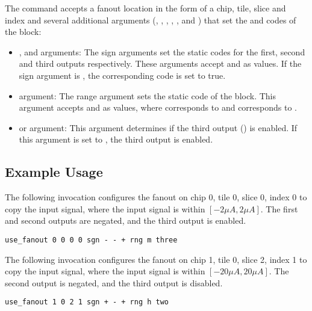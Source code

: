 The  command accepts a fanout location in the form of a chip,
tile, slice and index and several additional arguments
(, , , , , and ) that set
the \static and \dynamic codes of the block:
\begin{itemize}
\item {}, and  arguments: The sign arguments set the
   static codes for the first, second and third outputs respectively.
  These arguments accept \tx{+} and \tx{-} as values. If the sign argument is
  \tx{-}, the corresponding  code is set to true.
  \item{} argument: The range argument sets the  static code
    of the block. This argument accepts  and  as values, where
     corresponds to  and  corresponds to
    .
    \item{} or  argument: This argument determines if the third
      output () is enabled. If this argument is set to , the
      third output is enabled.
  \end{itemize}

\subsection{Example Usage}

The following invocation configures the fanout on chip 0, tile 0, slice 0, index
0 to copy the input signal, where the input signal is within $[-2 \mu A, 2 \mu
A]$. The first and second outputs are negated, and the third output is enabled.

\begin{lstlisting}
use_fanout 0 0 0 0 sgn - - + rng m three
\end{lstlisting}

The following invocation configures the fanout on chip 1, tile 0, slice 2, index
1 to copy the input signal, where the input signal is within $[-20 \mu A, 20 \mu
A]$. The second output is negated, and the third output is disabled.

\begin{lstlisting}
use_fanout 1 0 2 1 sgn + - + rng h two 
\end{lstlisting}